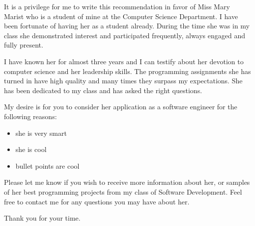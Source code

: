 \documentclass{article}
\begin{document}
It is a privilege for me to write this recommendation in favor of Miss Mary
Marist who is a student of mine at the Computer Science Department. I have been
fortunate of having her as a student already. During the time she was in my
class she demonstrated interest and participated frequently, always 
engaged and fully present.

I have known her for almost three years and I can testify about her devotion to
computer science and her leadership skills. The programming assignments she has
turned in have high quality and many times they surpass my expectations. She
has been dedicated to my class and has asked the right questions.

My desire is for you to consider her application as a software engineer for the
following reasons:
\begin{itemize}
  \item she is very smart
  \item she is cool
  \item bullet points are cool
\end{itemize}

Please let me know if you wish to receive more information about her, or
samples of her best programming projects from my class of Software Development.
Feel free to contact me for any questions you may have about her.

Thank you for your time.
\end{document}
